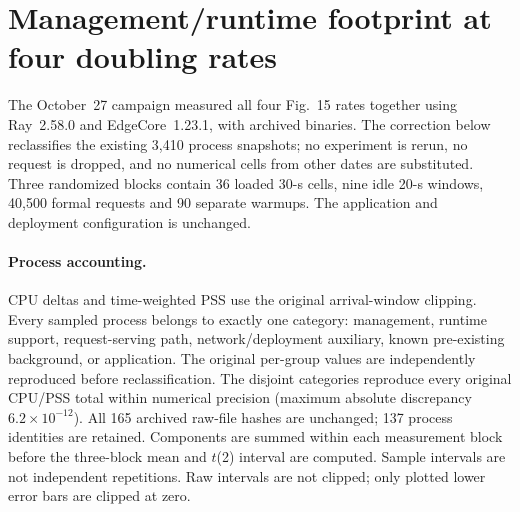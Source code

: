 \section*{Management/runtime footprint at four doubling rates}
The October~27 campaign measured all four Fig.~15 rates together using Ray~2.58.0 and EdgeCore~1.23.1, with archived binaries. The correction below reclassifies the existing 3,410 process snapshots; no experiment is rerun, no request is dropped, and no numerical cells from other dates are substituted. Three randomized blocks contain 36 loaded 30-s cells, nine idle 20-s windows, 40,500 formal requests and 90 separate warmups. The application and deployment configuration is unchanged.

\paragraph{Process accounting.}
CPU deltas and time-weighted PSS use the original arrival-window clipping. Every sampled process belongs to exactly one category: management, runtime support, request-serving path, network/deployment auxiliary, known pre-existing background, or application. The original per-group values are independently reproduced before reclassification. The disjoint categories reproduce every original CPU/PSS total within numerical precision (maximum absolute discrepancy $6.2\times10^{-12}$). All 165 archived raw-file hashes are unchanged; 137 process identities are retained. Components are summed within each measurement block before the three-block mean and $t$(2) interval are computed. Sample intervals are not independent repetitions. Raw intervals are not clipped; only plotted lower error bars are clipped at zero.

